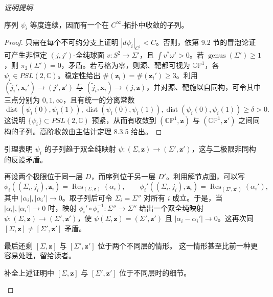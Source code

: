 \begin{proof}[证明提纲]
\begin{lemma}\label{lem:equicontinuity-biholomorphisms-stable-curves}
序列 $\psi_i$ 等度连续，因而有一个在 $C^\infty$-拓扑中收敛的子列。
\end{lemma}

\begin{proof}
只需在每个不可约分支上证明 $|d\psi_i|_{C^1}<C$。否则，依第 9.2 节的冒泡论证可产生非恒定
$(j,j')$-全纯球面 $v:S^2\to\Sigma'$，且 $\int v^*\omega'>0$。若
$\operatorname{genus}(\Sigma')\ge1$，则 $\pi_2(\Sigma')=0$，矛盾。若亏格为零，则源、靶都可视为
$\mathbb{CP}^1$，各 $\psi_i\in PSL(2,\mathbb C)$。稳定性给出
$\#(\boldsymbol z_i)=\#(\boldsymbol z_i')\ge3$。利用
$(\widetilde j_i',\boldsymbol x_i')\to(j',\boldsymbol z')$ 与
$(\widetilde j_i,\boldsymbol x_i)\to(j,\boldsymbol z)$，并对源、靶施以自同构，可令其中三点分别为
$0,1,\infty$，且有统一的分离常数
\[
 \operatorname{dist}(\psi_i(0),\psi_i(1)),
 \operatorname{dist}(\psi_i(0),\psi_i(1)),
 \operatorname{dist}(\psi_i(0),\psi_i(1))\ge\delta>0.
\]
这说明 $\{\psi_i\}\subset PSL(2,\mathbb C)$ 预紧，从而有收敛到
$(\mathbb{CP}^1,\boldsymbol z)$ 与
$(\mathbb{CP}^1,\boldsymbol z')$ 之间同构的子列。高阶收敛由主估计定理 8.3.5 给出。
\end{proof}

引理表明 $\psi_i$ 的子列趋于双全纯映射
$\psi:(\Sigma,\boldsymbol z)\to(\Sigma',\boldsymbol z')$，这与二极限非同构的反设矛盾。

再设两个极限位于同一层 $D$，而序列位于另一层 $D'$。利用解节点图，可以写
\[
 \phi_i((\Sigma_i,j_i),\boldsymbol z_i)
 =\operatorname{Res}_{(\Sigma,\boldsymbol z)}(\alpha_i),
 \qquad
 \phi_i'((\Sigma_i,j_i),\boldsymbol z_i)
 =\operatorname{Res}_{(\Sigma',\boldsymbol z')}(\alpha_i'),
\]
其中 $|\alpha_i|,|\alpha_i'|\to0$。取子列后可令
$\Sigma_i=\Sigma''$ 对所有 $i$ 成立。于是，当
$|\alpha_i|,|\alpha_i'|\to0$ 时，映射
$\phi_i'\circ\phi_i^{-1}:\Sigma''\to\Sigma''$ 给出一个双全纯映射
$\psi:(\Sigma,\boldsymbol z)\to(\Sigma',\boldsymbol z')$，使
$\psi(\Sigma,\boldsymbol z)=(\Sigma',\boldsymbol z')$ 且
$|\alpha_i-\alpha_i'|\to0$。这再次同
$[\Sigma,\boldsymbol z]\ne[\Sigma',\boldsymbol z']$ 矛盾。

最后还剩 $[\Sigma,\boldsymbol z]$ 与 $[\Sigma',\boldsymbol z']$ 位于两个不同层的情形。
这一情形甚至比前一种更容易处理，留给读者。

\begin{exercise}\label{ex:hausdorff-different-strata}
补全上述证明中 $[\Sigma,\boldsymbol z]$ 与
$[\Sigma',\boldsymbol z']$ 位于不同层时的细节。
\end{exercise}
\end{proof}
